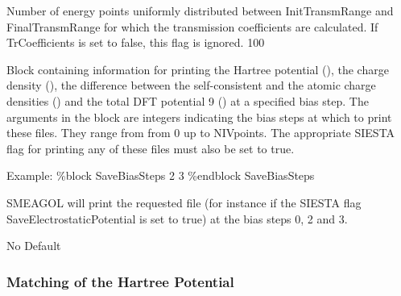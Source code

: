 \documentclass[11pt]{article}
\begin{document}
{
{Number of energy points uniformly distributed between InitTransmRange and FinalTransmRange for which the transmission coefficients are calculated. If TrCoefficients is set to false, this flag is ignored.}
{100}

{Block containing information for printing the Hartree potential (), the charge density (), the difference between the self-consistent and the atomic charge densities () and the total DFT potential 9 () at a specified bias step. The arguments in the block are integers indicating the bias steps at which to print these files. They range from from 0 up to NIVpoints.  The appropriate SIESTA flag for printing any of these files must also be set to true.

\begin{flushleft}
Example:\linebreak
{\ttfamily
\%block SaveBiasSteps 2 3\linebreak
\%endblock SaveBiasSteps}
\end{flushleft}
SMEAGOL will print the requested file (for instance  if the SIESTA flag SaveElectrostaticPotential is set to true) at the bias steps 0, 2 and 3.}
{No Default}

\subsubsection{Matching of the Hartree Potential}

}
\end{document}
